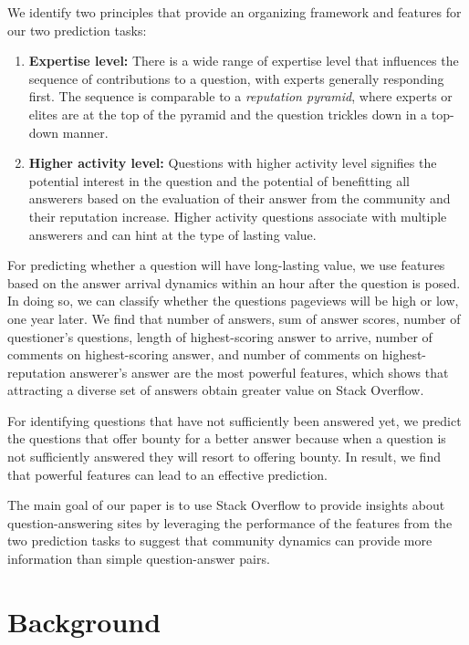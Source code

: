 We identify two principles that provide an organizing framework and features for our two prediction tasks:

	\begin{enumerate}
		\item \textbf{Expertise level: } There is a wide range of expertise level that  influences the sequence of contributions to a question, with experts generally responding first. The sequence is comparable to a \textit{reputation pyramid}, where experts or elites are at the top of the pyramid and the question trickles down in a top-down manner.
		\item \textbf{Higher activity level: } Questions with higher activity level signifies the potential interest in the question and the potential of benefitting all answerers based on the evaluation of their answer from the community and their reputation increase. Higher activity questions associate with multiple answerers and can hint at the type of lasting value.
	\end{enumerate}

For predicting whether a question will have long-lasting value, we use features based on the answer arrival dynamics within an hour after the question is posed. In doing so, we can classify whether the questions pageviews will be high or low, one year later. We find that number of answers, sum of answer scores, number of questioner's questions, length of highest-scoring answer to arrive, number of comments on highest-scoring answer, and number of comments on highest-reputation answerer's answer are the most powerful features, which shows that attracting a diverse set of answers obtain greater value on Stack Overflow.


For identifying questions that have not sufficiently been answered yet, we predict the questions that offer bounty for a better answer because when a question is not sufficiently answered they will resort to offering bounty. In result, we find that powerful features can lead to an effective prediction.


The main goal of our paper is to use Stack Overflow to provide insights about question-answering sites by leveraging the performance of the features from the two prediction tasks to suggest that community dynamics can provide more information than simple question-answer pairs. 

\section{Background}
